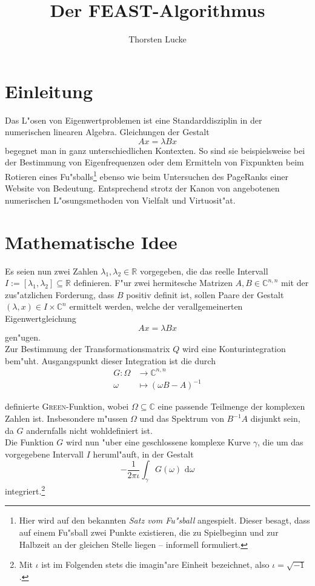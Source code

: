 \documentclass[a4paper, 11pt]{article}
\newcommand{\Cnn}{\mathbb{C}^{n,n}}
\newcommand{\C}{\mathbb{C}}
\begin{document}
\title{Der FEAST-Algorithmus}
\author{Thorsten Lucke}

\maketitle

\tableofcontents

\vfill
\section{Einleitung} %
Das L"osen von Eigenwertproblemen ist eine Standarddisziplin in der
numerischen linearen Algebra. Gleichungen der Gestalt
\[
Ax = \lambda Bx
\]
begegnet man in ganz unterschiedlichen Kontexten. So sind sie beispielsweise bei der Bestimmung von Eigenfrequenzen oder dem Ermitteln von Fixpunkten beim Rotieren eines Fu"sballs\footnote{Hier wird auf den bekannten \emph{Satz vom Fu"sball} angespielt. Dieser
besagt, dass auf einem Fu"sball zwei Punkte existieren, die zu Spielbeginn und zur Halbzeit
an der gleichen Stelle liegen -- informell formuliert.} ebenso wie beim Untersuchen des PageRanks einer Website von
Bedeutung.
Entsprechend strotz der Kanon von angebotenen numerischen
L"osungsmethoden von Vielfalt und Virtuosit"at.

\section{Mathematische Idee}
Es seien nun zwei  Zahlen $\lambda_1, \lambda_2 \in \mathbb{R}$ vorgegeben, die
das reelle Intervall $I:=[\lambda_1, \lambda_2] \subseteq \mathbb{R}$ definieren.
F"ur zwei hermitesche Matrizen $A, B \in \Cnn$ mit der zus"atzlichen
Forderung, dass $B$ positiv definit ist, sollen Paare der Gestalt
$(\lambda, x) \in I \times \mathbb{C}^n$ ermittelt werden, welche der verallgemeinerten
Eigenwertgleichung
\begin{equation}
Ax = \lambda Bx
\end{equation}
gen"ugen.\\

Zur Bestimmung der Transformationsmatrix $Q$ wird eine Konturintegration bem"uht.
Ausgangspunkt dieser Integration ist die durch
\begin{align*}
G\colon\Omega &\to\mathbb{C}^{n,n}\\
\omega &\mapsto (\omega B - A)^{-1}
\end{align*}

definierte  \textsc{Green}-Funktion, wobei $\Omega \subseteq \C$ eine passende
Teilmenge der komplexen Zahlen ist. Insbesondere m"ussen $\Omega$ und das
Spektrum von $B^{-1}A$ disjunkt sein, da $G$ andernfalls nicht wohldefiniert ist.\\

Die Funktion $G$ wird nun "uber eine geschlossene komplexe Kurve $\gamma$,
die um das vorgegebene Intervall $I$ heruml"auft, in der Gestalt
\[
-\frac{1}{2\pi\iota}\int_\gamma G(\omega)\text{ d}\omega
\]
integriert.\footnote{Mit $\iota$ ist im Folgenden stets die imagin"are Einheit bezeichnet,
also $\iota = \sqrt{-1}$.}
\end{document}
